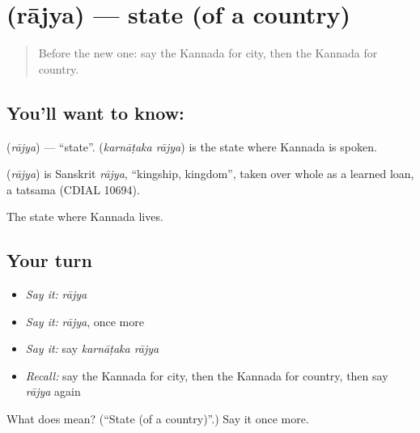 \section[\texorpdfstring{\kn{ರಾಜ್ಯ} (rājya)}{ರಾಜ್ಯ (rājya)}]{ (rājya) — state (of a country)}

\label{lesson:KA-C103-state}



\begin{quote}
Before the new one: say the Kannada for city, then the Kannada for country.
\end{quote}

\subsection*{You'll want to know: }
\textbf{} (\emph{rājya}) — \textquotedblleft{}state\textquotedblright{}. \textbf{ } (\emph{karnāṭaka rājya}) is the state where Kannada is spoken.

\begin{cousinweb}
\textbf{} (\emph{rājya}) is Sanskrit \emph{rājya}, \textquotedblleft{}kingship, kingdom\textquotedblright{}, taken over whole as a learned loan, a tatsama (CDIAL 10694).
\end{cousinweb}

\begin{grammarlens}[title={What you've built}]
The state where Kannada lives.
\end{grammarlens}

\subsection*{Your turn}
\begin{itemize}
\raggedright
  \item \emph{Say it:} \emph{rājya}
  \item \emph{Say it:} \emph{rājya}, once more
  \item \emph{Say it:} say \emph{karnāṭaka rājya}
  \item \emph{Recall:} say the Kannada for city, then the Kannada for country, then say \emph{rājya} again
\end{itemize}

\begin{tcolorbox}[breakable,colback=teal!4,colframe=teal!35!black,title={Before you move on}]
What does  mean? (\textquotedblleft{}State (of a country)\textquotedblright{}.) Say it once more.
\end{tcolorbox}
